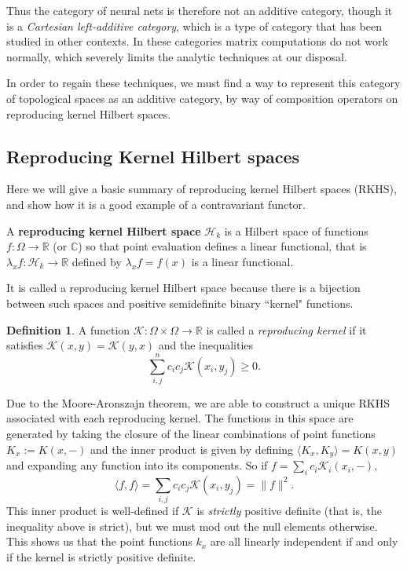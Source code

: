 \documentclass[12pt]{amsart}
\theoremstyle{definition}
\newtheorem{definition}[theorem]{Definition}
\numberwithin{equation}{section}
\begin{document}
Thus the category of neural nets is therefore not an additive category, though it is a \textit{Cartesian left-additive category}, which is a type of category that has been studied in other contexts. In these categories matrix computations do not work normally, which severely limits the analytic techniques at our disposal. 

In order to regain these techniques, we must find a way to represent this category of topological spaces as an additive category, by way of composition operators on reproducing kernel Hilbert spaces. 

\subsection{Reproducing Kernel Hilbert spaces}

Here we will give a basic summary of reproducing kernel Hilbert spaces (RKHS), and show how it is a good example of a contravariant functor. 

A \textbf{reproducing kernel Hilbert space} $\mathcal H_k$ is a Hilbert space of functions $f: \Omega \rightarrow \mathbb R$ (or $\mathbb C$)  so that point evaluation defines a linear functional, that is $\lambda_xf: \mathcal H_k \rightarrow \mathbb R$ defined by $\lambda_x f = f(x)$ is a linear functional. 

It is called a reproducing kernel Hilbert space because there is a bijection between such spaces and positive semidefinite binary ``kernel" functions. 
\begin{definition}
    A function $\mathcal K: \Omega \times \Omega \rightarrow \mathbb R$ is called a \textit{reproducing kernel} if it satisfies $\mathcal K(x, y) = \mathcal K(y, x)$ and the inequalities \[\sum_{i,j}^n c_ic_j \mathcal K(x_i, y_j) \geq 0.\] 
\end{definition}

Due to the Moore-Aronszajn theorem, we are able to construct a unique RKHS associated with each reproducing kernel. The functions in this space are generated by taking the closure of the linear combinations of point functions $K_x := K(x, -)$ and the inner product is given by defining $\langle K_x, K_y\rangle = K(x, y)$ and expanding any function into its components. So if $f = \sum_i c_i\mathcal K_i(x_i, -),$ \[\langle f, f\rangle = \sum_{i,j} c_ic_j \mathcal K(x_i, y_j) = \|f\|^2.\] This inner product is well-defined if $\mathcal K$ is \textit{strictly} positive definite (that is, the inequality above is strict), but we must mod out the null elements otherwise. This shows us that the point functions $k_x$ are all linearly independent if and only if the kernel is strictly positive definite. 
\end{document}
